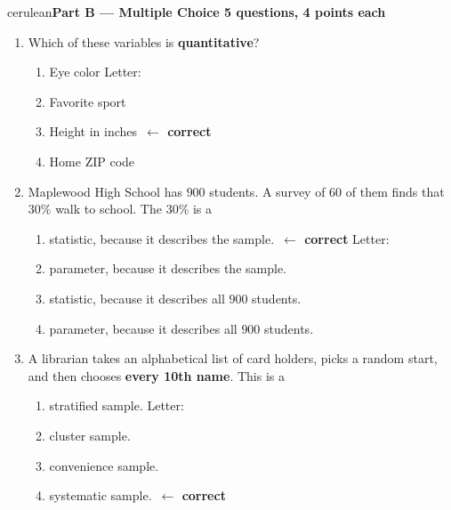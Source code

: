 \documentclass[10pt]{article}
\makeatletter
\newcommand{\parthead}[1]{%
  \vspace{6pt}\noindent
  {\tcbset{after={\par\nopagebreak}}%
   \begin{headlinebox}{cerulean}{\color{white}\bfseries #1}\end{headlinebox}}%
  \nopagebreak\vspace{4pt}}
\newcommand{\correct}{\ifsaar@workvisible\ \textcolor{keyred}{\textbf{$\leftarrow$ correct}}\fi}
\makeatother
\begin{document}
\boxguard[8]
\parthead{Part B --- Multiple Choice \hfill 5 questions, 4 points each}

\small
\begin{enumerate}[leftmargin=2.2em, itemsep=5pt, topsep=2pt, start=11]

\item Which of these variables is \textbf{quantitative}?
\begin{enumerate}[label=(\Alph*), leftmargin=1.8em, itemsep=1pt, topsep=1pt]
  \item Eye color
\hfill Letter:~\gradedblank[id=q11, type=choice, points=4, answer={C}]{0.45in}{10pt}  \item Favorite sport
  \item Height in inches\correct
  \item Home ZIP code
\end{enumerate}

\boxguard[7]
\item Maplewood High School has $900$ students. A survey of $60$ of them finds that
$30\%$ walk to school. The $30\%$ is a
\begin{enumerate}[label=(\Alph*), leftmargin=1.8em, itemsep=1pt, topsep=1pt]
  \item statistic, because it describes the sample.\correct
\hfill Letter:~\gradedblank[id=q12, type=choice, points=4, answer={A}]{0.45in}{10pt}  \item parameter, because it describes the sample.
  \item statistic, because it describes all $900$ students.
  \item parameter, because it describes all $900$ students.
\end{enumerate}

\boxguard[7]
\item A librarian takes an alphabetical list of card holders, picks a random start, and
then chooses \textbf{every 10th name}. This is a
\begin{enumerate}[label=(\Alph*), leftmargin=1.8em, itemsep=1pt, topsep=1pt]
  \item stratified sample.
\hfill Letter:~\gradedblank[id=q13, type=choice, points=4, answer={D}]{0.45in}{10pt}  \item cluster sample.
  \item convenience sample.
  \item systematic sample.\correct
\end{enumerate}


\end{enumerate}
\end{document}

